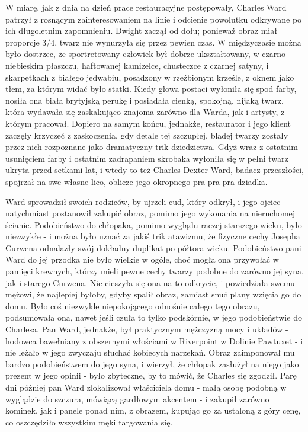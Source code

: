 W miarę, jak z dnia na dzień prace restauracyjne postępowały, Charles Ward patrzył z rosnącym zainteresowaniem na linie i odcienie powolutku odkrywane po ich długoletnim zapomnieniu. Dwight zaczął od dołu; ponieważ obraz miał proporcje 3/4, twarz nie wynurzyła się przez pewien czas. W międzyczasie można było dostrzec, że sportretowany człowiek był dobrze ukształtowany, w czarno-niebieskim płaszczu, haftowanej kamizelce, chusteczce z czarnej satyny, i skarpetkach z białego jedwabiu, posadzony w rzeźbionym krześle, z oknem jako tłem, za którym widać było statki. Kiedy głowa postaci wyłoniła się spod farby, nosiła ona biała brytyjską perukę i posiadała cienką, spokojną, nijaką twarz, która wydawała się zaskakująco znajoma zarówno dla Warda, jak i artysty, z którym pracował. Dopiero na samym końcu, jednakże, restaurator i jego klient zaczęły krzyczeć z zaskoczenia, gdy detale tej szczupłej, bladej twarzy zostały przez nich rozpoznane jako dramatyczny trik dziedzictwa. Gdyż wraz z ostatnim usunięciem farby i ostatnim zadrapaniem skrobaka wyłoniła się w pełni twarz ukryta przed setkami lat, i wtedy to też Charles Dexter Ward, badacz przeszłości, spojrzał na swe własne lico, oblicze jego okropnego pra-pra-pra-dziadka. 

Ward sprowadził swoich rodziców, by ujrzeli cud, który odkrył, i jego ojciec natychmiast postanowił zakupić obraz, pomimo jego wykonania na nieruchomej ścianie. Podobieństwo do chłopaka, pomimo wyglądu raczej starszego wieku, było niezwykłe - i można było uznać za jakiś trik atawizmu, że fizyczne cechy Josepha Curwena odnalazły swój dokładny duplikat po półtora wieku. Podobieństwo pani Ward do jej przodka nie było wielkie w ogóle, choć mogła ona przywołać w pamięci krewnych, którzy mieli pewne cechy twarzy podobne do zarówno jej syna, jak i starego Curwena. Nie cieszyła się ona na to odkrycie, i powiedziała swemu mężowi, że najlepiej byłoby, gdyby spalił obraz, zamiast snuć plany wzięcia go do domu. Było coś niezwykle niepokojącego odnośnie całego tego obrazu, podsumowała ona, nawet jeśli czuła to tylko podskórnie, w jego podobieństwie do Charlesa. Pan Ward, jednakże, był praktycznym mężczyzną mocy i układów - hodowca bawełniany z obszernymi włościami w Riverpoint w Dolinie Pawtuxet - i nie leżało w jego zwyczaju słuchać kobiecych narzekań. Obraz zaimponował mu bardzo podobieństwem do jego syna, i wierzył, że chłopak zasłużył na niego jako prezent w jego opinii - było zbyteczne, by to mówić, że Charles się zgodził. Parę dni później pan Ward zlokalizował właściciela domu - małą osobę podobną w wyglądzie do szczura, mówiącą gardłowym akcentem - i zakupił zarówno kominek, jak i panele ponad nim, z obrazem, kupując go za ustaloną z góry cenę, co oszczędziło wszystkim męki targowania się. 

